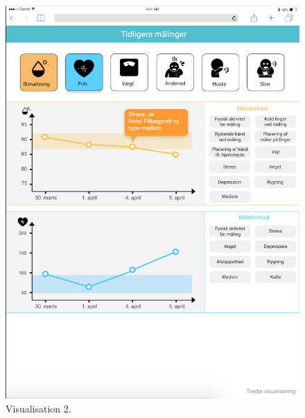 \begin{figure}[h]
\begin{minipage}[b]{0.45\textwidth}
    \includegraphics[width=\textwidth]{images/study2/v2.png}
    \caption{Visualisation 2.}
    \label{fig:v2}
  \end{minipage}
\end{figure}

